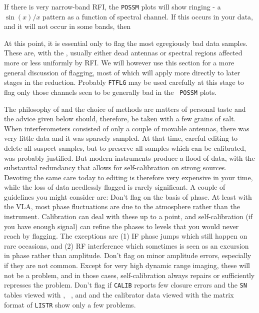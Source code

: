 
If there is very narrow-band RFI, the {\tt POSSM} plots will show
ringing - a $\sin(x) / x$ pattern as a function of spectral channel.
If this occurs in your data, and it will not occur in some bands,
then


At this point, it is essential only to flag the most egregiously bad
data samples.  These are, with the , usually either dead
antennas or spectral regions affected more or less uniformly by RFI\@.
We will however use this section for a more general discussion of
flagging, most of which will apply more directly to later stages in
the reduction.  Probably {\tt FTFLG} may be used carefully at this
stage to flag only those channels seen to be generally bad in the {\tt
POSSM} plots.

     The philosophy of  and the choice of methods are
matters of personal taste and the advice given below should,
therefore, be taken with a few grains of salt.  When interferometers
consisted of only a couple of movable antennas, there was very little
data and it was sparsely sampled.  At that time, careful editing to
delete all suspect samples, but to preserve all samples which can be
calibrated, was probably justified.  But modern instruments produce a
flood of data, with the substantial redundancy that allows for
self-calibration on strong sources.  Devoting the same care today to
editing is therefore very expensive in your time, while the loss of
data needlessly flagged is rarely significant.  A couple of guidelines
you might consider are:
\xbit
\Item Don't flag on the basis of phase.  At least with the VLA,
    most phase fluctuations are due to the atmosphere rather than the
    instrument.  Calibration can deal with these up to a point, and
    self-calibration (if you have enough signal) can refine the phases
    to levels that you would never reach by flagging.  The exceptions
    are (1) IF phase jumps which still happen on rare occasions, and
    (2) RF interference which sometimes is seen as an excursion in
    phase rather than amplitude.
\Item Don't flag on minor amplitude errors, especially if they are
    not common.  Except for very high dynamic range imaging, these
    will not be a problem, and in those cases, self-calibration always
    repairs or sufficiently represses the problem.
\Item Don't flag if {\tt CALIB} reports few closure errors and the
    {\tt SN} tables viewed with {\tt {}}, {\tt
    }, and {\tt {}} and the calibrator data
    viewed with the matrix format of {\tt LISTR} show only a few
    problems.
\xeit

